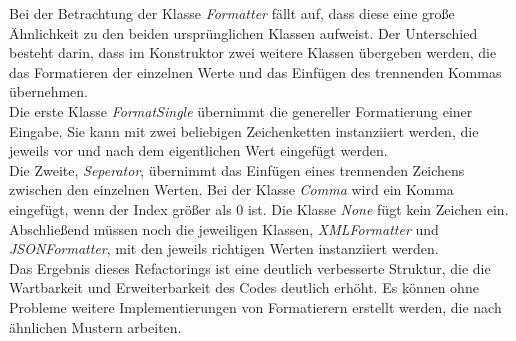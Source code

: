 \newpage
Bei der Betrachtung der Klasse \textit{Formatter} fällt auf, dass diese eine große Ähnlichkeit zu den beiden ursprünglichen Klassen aufweist.
Der Unterschied besteht darin, dass im Konstruktor zwei weitere Klassen übergeben werden, die das Formatieren der einzelnen Werte und das Einfügen des trennenden Kommas übernehmen.\\
Die erste Klasse \textit{FormatSingle} übernimmt die genereller Formatierung einer Eingabe. Sie kann mit zwei beliebigen Zeichenketten instanziiert werden, die jeweils vor und nach dem eigentlichen Wert eingefügt werden.\\
Die Zweite, \textit{Seperator}, übernimmt das Einfügen eines trennenden Zeichens zwischen den einzelnen Werten. Bei der Klasse \textit{Comma} wird ein Komma eingefügt, wenn der Index größer als 0 ist. Die Klasse \textit{None} fügt kein Zeichen ein.\\
Abschließend müssen noch die jeweiligen Klassen, \textit{XMLFormatter} und \textit{JSONFormatter}, mit den jeweils richtigen Werten instanziiert werden.\\

Das Ergebnis dieses Refactorings ist eine deutlich verbesserte Struktur, die die Wartbarkeit und Erweiterbarkeit des Codes deutlich erhöht. Es können ohne Probleme weitere Implementierungen von Formatierern erstellt werden, die nach ähnlichen Mustern arbeiten. 
